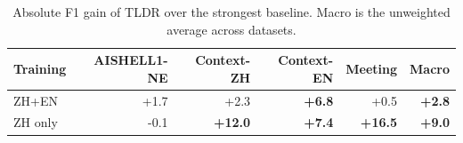 \begin{table}[t]
\centering
\small
\setlength{\tabcolsep}{4pt}
\caption{Absolute F1 gain of TLDR over the strongest baseline. Macro is the unweighted average across datasets.}
\label{tab:tldr-f1-gain}
\begin{tabular}{lrrrrr}
\toprule
Training & AISHELL1-NE & Context-ZH & Context-EN & Meeting & Macro \\
\midrule
ZH+EN & +1.7 & +2.3 & \textbf{+6.8} & +0.5 & \textbf{+2.8} \\
ZH only & -0.1 & \textbf{+12.0} & \textbf{+7.4} & \textbf{+16.5} & \textbf{+9.0} \\
\bottomrule
\end{tabular}
\end{table}
